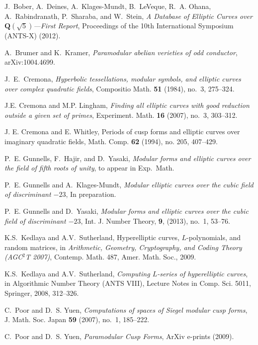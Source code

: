 \begin{thebibliography}{999}

J.~Bober, A.~Deines, A.~Klages-Mundt, B.~LeVeque, R.~A. Ohana, A.~Rabindranath,
  P.~Sharaba, and W.~Stein, \emph{A {D}atabase of {E}lliptic {C}urves over
  {$\mathbf{Q}(\sqrt{5})$}---{F}irst {R}eport}, Proceedings of the 10th
  International Symposium (ANTS-X) (2012).

A.~Brumer and K.~Kramer, \emph{Paramodular abelian verieties of odd conductor},
arXiv:1004.4699.


J.~E.~Cremona, \emph{Hyperbolic tessellations, modular symbols, and elliptic curves over complex quadratic fields},
Compositio Math. \textbf{51} (1984), no.~3, 275--324.

J.\thinspace{}E. Cremona and M.\thinspace{}P. Lingham, \emph{Finding all
  elliptic curves with good reduction outside a given set of primes},
  Experiment. Math. \textbf{16} (2007), no.~3, 303--312. 

J. E. Cremona and E. Whitley, {Periods of cusp forms and elliptic curves over imaginary quadratic fields},
Math. Comp. {\bf 62} (1994), no. 205, 407--429.



P.~E. Gunnells, F.~Hajir, and D.~Yasaki, \emph{Modular forms and elliptic
  curves over the field of fifth roots of unity}, to appear in Exp.~Math.

  P.~E. Gunnells and A.~Klages-Mundt, \emph{Modular elliptic curves over the
  cubic field of discriminant $-23$}, In preparation.

 P.~E. Gunnells and D.~Yasaki, 
 \emph{Modular forms and elliptic curves over the
    cubic field of discriminant $-23$}, Int. J. Number Theory, \textbf{9},
 (2013), no.~1, 53--76.

 K.S.~Kedlaya and A.V.~Sutherland,
Hyperelliptic curves, $L$-polynomials, and random matrices, in
\textit{Arithmetic, Geometry, Cryptography, and Coding Theory (AGC$^2$T
2007)}, Contemp. Math. 487, Amer. Math. Soc., 2009.

K.S.~Kedlaya and A.V.~Sutherland,
{\em Computing $L$-series of hyperelliptic curves},
in Algorithmic Number Theory (ANTS VIII),
Lecture Notes in Comp. Sci. 5011, Springer, 2008, 312--326.

C.~{Poor} and D.~S. {Yuen}, 
\emph{Computations of spaces of Siegel modular cusp forms},
J. Math. Soc. Japan \textbf{59} (2007), no.~1, 185--222. 

C.~{Poor} and D.~S. {Yuen}, 
\emph{{Paramodular Cusp Forms}}, ArXiv e-prints
  (2009).


\end{thebibliography}
